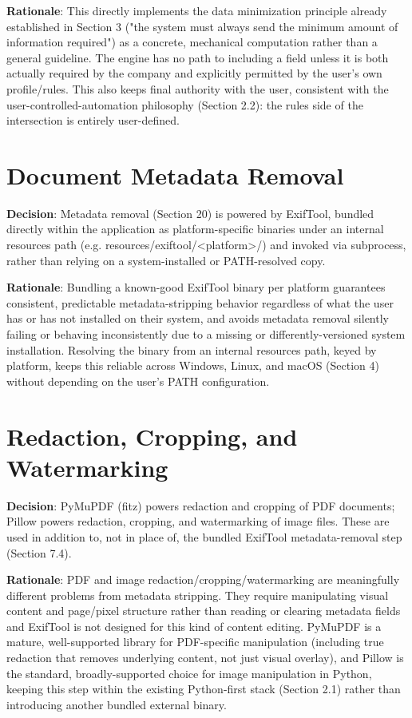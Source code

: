 \textbf{Rationale}: This directly implements the data minimization principle already established in Section 3 ("the system must always send the minimum amount of information required") as a concrete, mechanical computation rather than a general guideline. The engine has no path to including a field unless it is both actually required by the company and explicitly permitted by the user's own profile/rules. This also keeps final authority with the user, consistent with the user-controlled-automation philosophy (Section 2.2): the rules side of the intersection is entirely user-defined.
\section{Document Metadata Removal}
\textbf{Decision}: Metadata removal (Section 20) is powered by ExifTool, bundled directly within the application as platform-specific binaries under an internal resources path (e.g. resources/exiftool/<platform>/) and invoked via subprocess, rather than relying on a system-installed or PATH-resolved copy.

\textbf{Rationale}: Bundling a known-good ExifTool binary per platform guarantees consistent, predictable metadata-stripping behavior regardless of what the user has or has not installed on their system, and avoids metadata removal silently failing or behaving inconsistently due to a missing or differently-versioned system installation. Resolving the binary from an internal resources path, keyed by platform, keeps this reliable across Windows, Linux, and macOS (Section 4) without depending on the user's PATH configuration.
\section{Redaction, Cropping, and Watermarking}
\textbf{Decision}: PyMuPDF (fitz) powers redaction and cropping of PDF documents; Pillow powers redaction, cropping, and watermarking of image files. These are used in addition to, not in place of, the bundled ExifTool metadata-removal step (Section 7.4).

\textbf{Rationale}: PDF and image redaction/cropping/watermarking are meaningfully different problems from metadata stripping. They require manipulating visual content and page/pixel structure rather than reading or clearing metadata fields and ExifTool is not designed for this kind of content editing. PyMuPDF is a mature, well-supported library for PDF-specific manipulation (including true redaction that removes underlying content, not just visual overlay), and Pillow is the standard, broadly-supported choice for image manipulation in Python, keeping this step within the existing Python-first stack (Section 2.1) rather than introducing another bundled external binary.

\sentinelchapterend